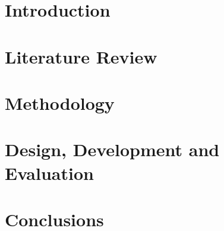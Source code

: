 \documentclass[harvard]{lincolncsthesis}
\begin{document}

\maketitle

%





\thesisTables
\thesisBodyStart



\chapter{Introduction}

 
\chapter{Literature Review}


\chapter{Methodology}


\chapter{Design, Development and Evaluation}


\chapter{Conclusions}

\end{document}
